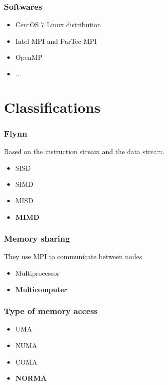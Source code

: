 \documentclass{beamer}
\begin{document}
\begin{frame}
  \frametitle{Softwares}
  \begin{itemize}
    \item CentOS 7 Linux distribution
    \item Intel MPI and ParTec MPI
    \item OpenMP
    \item ...
  \end{itemize}
\end{frame}


\section{Classifications}

\begin{frame}
  \frametitle{Flynn}
  Based on the instruction stream and the data stream.

  \begin{itemize}
    \item SISD
    \item SIMD
    \item MISD
    \item \textbf{MIMD}
  \end{itemize}
\end{frame}

\begin{frame}
  \frametitle{Memory sharing}
  They use MPI to communicate between nodes.

  \begin{itemize}
    \item Multiprocessor
    \item \textbf{Multicomputer}
  \end{itemize}

\end{frame}

\begin{frame}
  \frametitle{Type of memory access}
  \begin{itemize}
    \item UMA
    \item NUMA
    \item COMA
    \item \textbf{NORMA}
  \end{itemize}
\end{frame}
\end{document}

